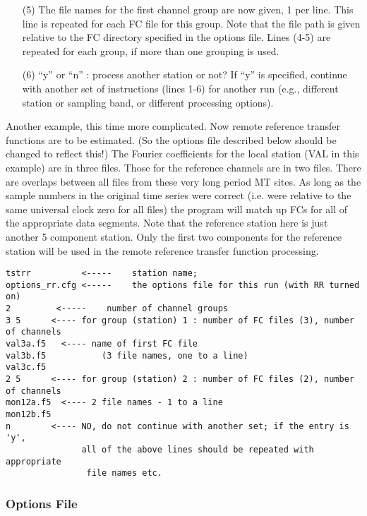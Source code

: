 \begin{itemize}
\item[(5)]
The file names for the first channel group are now given, 1 per line.
This line is repeated for each FC file for this group.
Note that the file path is given relative to the FC directory specified
in the options file.
Lines (4-5) are repeated for each group, if more than one grouping is used.

\item[(6)]
``y'' or ``n'' : process another station or not?
If ``y'' is specified, continue with another set of instructions
(lines 1-6) for another run (e.g., different station or sampling band,
or different processing options).
\end{itemize}

Another example, this time more complicated.
Now remote reference transfer functions are to be estimated.
(So the options file described below should be changed to reflect this!)
The Fourier coefficients for the local station 
(VAL in this example) are in three files.
Those for the reference channels are in two files.
There are overlaps between all files from these very long period MT sites.
As long as the sample numbers in the original time series
were correct (i.e. were relative to the same universal clock zero
for all files) the program will match up
FCs for all of the appropriate data segments.
Note that the reference station here is just another 5 component
station.
Only the first two components for the reference station will
be used in the remote reference transfer function processing.

\small
\begin{verbatim}
tstrr          <-----    station name; 
options_rr.cfg <-----    the options file for this run (with RR turned on)
2         <-----    number of channel groups
3 5      <---- for group (station) 1 : number of FC files (3), number of channels
val3a.f5   <---- name of first FC file  
val3b.f5           (3 file names, one to a line)
val3c.f5
2 5      <---- for group (station) 2 : number of FC files (2), number of channels
mon12a.f5  <---- 2 file names - 1 to a line
mon12b.f5
n        <---- NO, do not continue with another set; if the entry is 'y',
               all of the above lines should be repeated with appropriate
                file names etc.
\end{verbatim}
\normalsize



\subsubsection{Options File}

